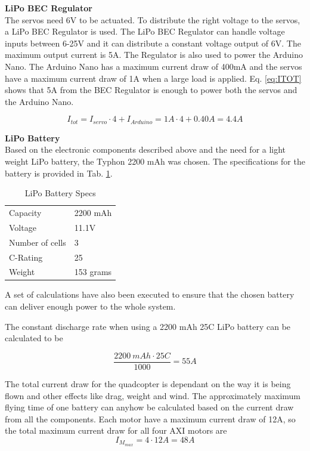 \textbf{LiPo BEC Regulator}\\
The servos need 6V to be actuated. To distribute the right voltage to the servos, a LiPo BEC Regulator is used. The LiPo BEC Regulator can handle voltage inputs between 6-25V and it can distribute a constant voltage output of 6V. The maximum output current is 5A. The Regulator is also used to power the Arduino Nano. The Arduino Nano has a maximum current draw of 400mA and the servos have a maximum current draw of 1A when a large load is applied. Eq. \ref{eq:ITOT} shows that 5A from the BEC Regulator is enough to power both the servos and the Arduino Nano. 

\begin{equation}
\label{eq:ITOT}
   I_{tot} = I_{servo}\cdot4 + I_{Arduino} = 1A\cdot4 + 0.40A = 4.4A 
\end{equation}\bigskip


\textbf{LiPo Battery}\\
Based on the electronic components described above and the need for a light weight LiPo battery, the Typhon 2200 mAh was chosen. The specifications for the battery is provided in Tab. \ref{tab:lipospecs}. 
\begin{table}[H]
    \begin{center}
    \caption{LiPo Battery Specs} 
    \label{tab:lipospecs} 
        \begin{tabular}{|l|l|}
            \hline 
                Capacity & 2200 mAh \\
                Voltage & 11.1V \\
                Number of cells & 3 \\
                C-Rating & 25 \\
                Weight & 153 grams \\
            \hline
        \end{tabular}
    \end{center}
\end{table} \bigskip

A set of calculations have also been executed to ensure that the chosen battery can deliver enough power to the whole system. \bigskip

The constant discharge rate when using a 2200 mAh 25C LiPo battery can be calculated to be

\begin{equation}
    \frac{2200\:mAh \cdot 25 C}{1000} = 55 A
\end{equation} \bigskip

The total current draw for the quadcopter is dependant on the way it is being flown and other effects like drag, weight and wind. The approximately maximum flying time of one battery can anyhow be calculated based on the current draw from all the components. Each motor have a maximum current draw of 12A, so the total maximum current draw for all four AXI motors are
\begin{equation}
    I_{M}_{max} = 4 \cdot 12A = 48 A
\end{equation}

